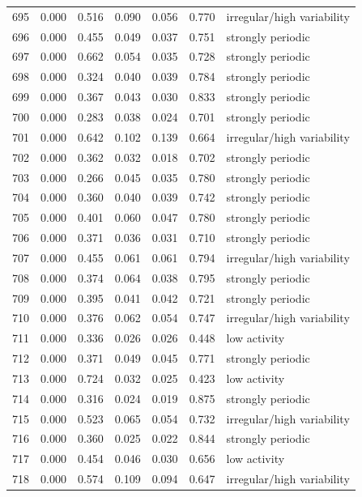 \begin{longtable}{lrrrrrl}
695 & 0.000 & 0.516 & 0.090 & 0.056 & 0.770 & irregular/high variability \\
696 & 0.000 & 0.455 & 0.049 & 0.037 & 0.751 & strongly periodic \\
697 & 0.000 & 0.662 & 0.054 & 0.035 & 0.728 & strongly periodic \\
698 & 0.000 & 0.324 & 0.040 & 0.039 & 0.784 & strongly periodic \\
699 & 0.000 & 0.367 & 0.043 & 0.030 & 0.833 & strongly periodic \\
700 & 0.000 & 0.283 & 0.038 & 0.024 & 0.701 & strongly periodic \\
701 & 0.000 & 0.642 & 0.102 & 0.139 & 0.664 & irregular/high variability \\
702 & 0.000 & 0.362 & 0.032 & 0.018 & 0.702 & strongly periodic \\
703 & 0.000 & 0.266 & 0.045 & 0.035 & 0.780 & strongly periodic \\
704 & 0.000 & 0.360 & 0.040 & 0.039 & 0.742 & strongly periodic \\
705 & 0.000 & 0.401 & 0.060 & 0.047 & 0.780 & strongly periodic \\
706 & 0.000 & 0.371 & 0.036 & 0.031 & 0.710 & strongly periodic \\
707 & 0.000 & 0.455 & 0.061 & 0.061 & 0.794 & irregular/high variability \\
708 & 0.000 & 0.374 & 0.064 & 0.038 & 0.795 & strongly periodic \\
709 & 0.000 & 0.395 & 0.041 & 0.042 & 0.721 & strongly periodic \\
710 & 0.000 & 0.376 & 0.062 & 0.054 & 0.747 & irregular/high variability \\
711 & 0.000 & 0.336 & 0.026 & 0.026 & 0.448 & low activity \\
712 & 0.000 & 0.371 & 0.049 & 0.045 & 0.771 & strongly periodic \\
713 & 0.000 & 0.724 & 0.032 & 0.025 & 0.423 & low activity \\
714 & 0.000 & 0.316 & 0.024 & 0.019 & 0.875 & strongly periodic \\
715 & 0.000 & 0.523 & 0.065 & 0.054 & 0.732 & irregular/high variability \\
716 & 0.000 & 0.360 & 0.025 & 0.022 & 0.844 & strongly periodic \\
717 & 0.000 & 0.454 & 0.046 & 0.030 & 0.656 & low activity \\
718 & 0.000 & 0.574 & 0.109 & 0.094 & 0.647 & irregular/high variability \\

\end{longtable}
